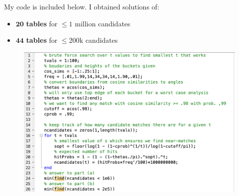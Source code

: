 \documentclass[11pt]{article}
\begin{document}
	My code is included below. I obtained solutions of:
	\begin{itemize}
		\item $\mathbf{20}$ \textbf{tables} for $\leq 1$ million candidates
		\item  $\mathbf{44}$ \textbf{tables} for $\leq 200$k candidates
	\end{itemize}
	
	\begin{figure}
	\includegraphics[width=\textwidth]{matlabCode.png}
	\end{figure}
	
	
\end{document}

